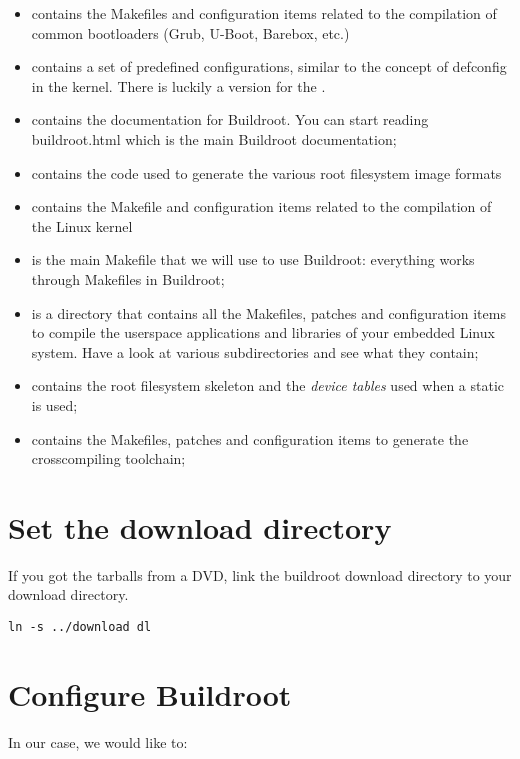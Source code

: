 \begin{itemize}
\item {} contains the Makefiles and configuration items
  related to the compilation of common bootloaders (Grub, U-Boot,
  Barebox, etc.)
\item {} contains a set of predefined configurations,
  similar to the concept of defconfig in the kernel.
  There is luckily a version for the \devboard.
\item {} contains the documentation for Buildroot. You can
  start reading buildroot.html which is the main Buildroot
  documentation;
\item {} contains the code used to generate the various root
  filesystem image formats
\item {} contains the Makefile and configuration items
  related to the compilation of the Linux kernel
\item {} is the main Makefile that we will use to use
  Buildroot: everything works through Makefiles in Buildroot;
\item {} is a directory that contains all the Makefiles,
  patches and configuration items to compile the userspace
  applications and libraries of your embedded Linux system. Have a
  look at various subdirectories and see what they contain;
\item {} contains the root filesystem skeleton and the {\em
    device tables} used when a static  is used;
\item {} contains the Makefiles, patches and
  configuration items to generate the crosscompiling toolchain;
\end{itemize}

\section{Set the download directory}
If you got the tarballs from a DVD, link the buildroot
download directory  to your download directory.

\begin{verbatim}
ln -s ../download dl
\end{verbatim}


\section{Configure Buildroot}

In our case, we would like to:

